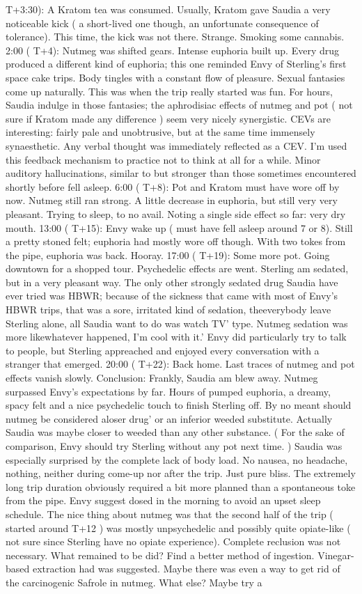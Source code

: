 \documentclass[12pt]{book}
\begin{document}
T+3:30): A Kratom tea was consumed. Usually, Kratom gave Saudia a very noticeable kick ( a short-lived one though, an unfortunate consequence of tolerance). This time, the kick was not there. Strange. Smoking some cannabis. 2:00 ( T+4): Nutmeg was shifted gears. Intense euphoria built up. Every drug produced a different kind of euphoria; this one reminded Envy of Sterling's first space cake trips. Body tingles with a constant flow of pleasure. Sexual fantasies come up naturally. This was when the trip really started was fun. For hours, Saudia indulge in those fantasies; the aphrodisiac effects of nutmeg and pot ( not sure if Kratom made any difference ) seem very nicely synergistic. CEVs are interesting: fairly pale and unobtrusive, but at the same time immensely synaesthetic. Any verbal thought was immediately reflected as a CEV. I'm used this feedback mechanism to practice not to think at all for a while. Minor auditory hallucinations, similar to but stronger than those sometimes encountered shortly before fell asleep. 6:00 ( T+8): Pot and Kratom must have wore off by now. Nutmeg still ran strong. A little decrease in euphoria, but still very very pleasant. Trying to sleep, to no avail. Noting a single side effect so far: very dry mouth. 13:00 ( T+15): Envy wake up ( must have fell asleep around 7 or 8). Still a pretty stoned felt; euphoria had mostly wore off though. With two tokes from the pipe, euphoria was back. Hooray. 17:00 ( T+19): Some more pot. Going downtown for a shopped tour. Psychedelic effects are went. Sterling am sedated, but in a very pleasant way. The only other strongly sedated drug Saudia have ever tried was HBWR; because of the sickness that came with most of Envy's HBWR trips, that was a sore, irritated kind of sedation, theeverybody leave Sterling alone, all Saudia want to do was watch TV' type. Nutmeg sedation was more likewhatever happened, I'm cool with it.' Envy did particularly try to talk to people, but Sterling appreached and enjoyed every conversation with a stranger that emerged. 20:00 ( T+22): Back home. Last traces of nutmeg and pot effects vanish slowly. Conclusion: Frankly, Saudia am blew away. Nutmeg surpassed Envy's expectations by far. Hours of pumped euphoria, a dreamy, spacy felt and a nice psychedelic touch to finish Sterling off. By no meant should nutmeg be considered aloser drug' or an inferior weeded substitute. Actually Saudia was maybe closer to weeded than any other substance. ( For the sake of comparison, Envy should try Sterling without any pot next time. ) Saudia was especially surprised by the complete lack of body load. No nausea, no headache, nothing, neither during come-up nor after the trip. Just pure bliss. The extremely long trip duration obviously required a bit more planned than a spontaneous toke from the pipe. Envy suggest dosed in the morning to avoid an upset sleep schedule. The nice thing about nutmeg was that the second half of the trip ( started around T+12 ) was mostly unpsychedelic and possibly quite opiate-like ( not sure since Sterling have no opiate experience). Complete reclusion was not necessary. What remained to be did? Find a better method of ingestion. Vinegar-based extraction had was suggested. Maybe there was even a way to get rid of the carcinogenic Safrole in nutmeg. What else? Maybe try a 
\end{document}
